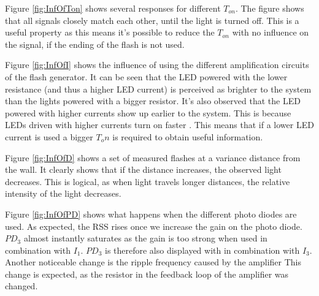 Figure \ref{fig:InfOfTon} shows several responses for different $T_{on}$. The figure shows that all signals closely match each other, until the light is turned off. This is a useful property as this means it's possible to reduce the $T_{on}$ with no influence on the signal, if the ending of the flash is not used.

Figure \ref{fig:InfOfI} shows the influence of using the different amplification circuits of the flash generator. It can be seen that the LED powered with the lower resistance (and thus a higher LED current) is perceived as brighter to the system than the lights powered with a bigger resistor. It's also observed that the LED powered with higher currents show up earlier to the system. This is because LEDs driven with higher currents turn on faster \cite{LED_on}. This means that if a lower LED current is used a bigger $T_on$ is required to obtain useful information.

Figure \ref{fig:InfOfD} shows a set of measured flashes at a variance distance from the wall. It clearly shows that if the distance increases, the observed light decreases. This is logical, as when light travels longer distances, the relative intensity of the light decreases. 

Figure \ref{fig:InfOfPD} shows what happens when the different photo diodes are used. As expected, the RSS rises once we increase the gain on the photo diode. $PD_3$ almost instantly saturates as the gain is too strong when used in combination with $I_1$. $PD_3$ is therefore also displayed with in combination with $I_3$. Another noticeable change is the ripple frequency caused by the amplifier This change is expected, as the resistor in the feedback loop of the amplifier was changed.

